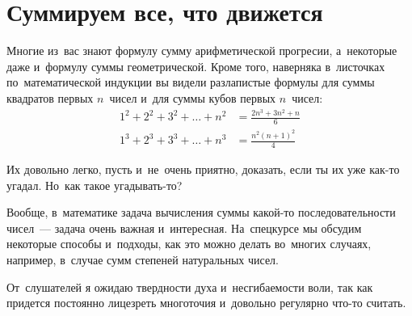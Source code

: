 
\section*{Суммируем все, что движется}



Многие из~вас знают формулу сумму арифметической прогресии, а~некоторые даже
и~формулу суммы геометрической.
Кроме того, наверняка в~листочках по~математической индукции вы видели
разлапистые формулы для суммы квадратов первых $n$~чисел и~для суммы кубов
первых $n$~чисел:
\begin{align*}
    1^2 + 2^2 + 3^2 + \ldots + n^2
&=
    \frac{2n^3 + 3n^2 + n}{6}
\\
    1^3 + 2^3 + 3^3 + \ldots + n^3
&=
    \frac{n^2 (n + 1)^2}{4}
\end{align*}

Их довольно легко, пусть и~не~очень приятно, доказать, если ты их уже как-то
угадал.
Но~как такое угадывать-то?

Вообще, в~математике задача вычисления суммы какой-то последовательности
чисел~--- задача очень важная и~интересная.
На~спецкурсе мы обсудим некоторые способы и~подходы, как это можно делать
во~многих случаях, например, в~случае сумм степеней натуральных чисел.

От~слушателей я ожидаю твердности духа и~несгибаемости воли, так как придется
постоянно лицезреть многоточия и~довольно регулярно что-то считать.

